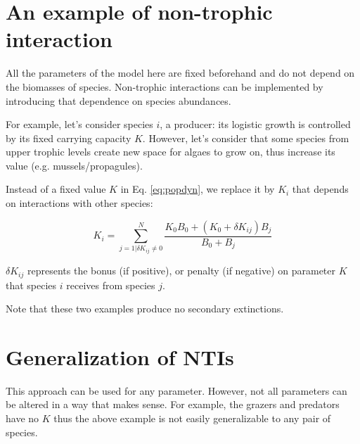 \documentclass[a4paper,11pt]{article}
\begin{document}
  
  \section{An example of non-trophic interaction}
    All the parameters of the model here are fixed beforehand and do not depend 
on the biomasses of species. Non-trophic interactions can be implemented by 
introducing that dependence on species abundances.
    
    For example, let's consider species $i$, a producer: its logistic growth is 
controlled by its fixed carrying capacity $K$. However, let's consider that some 
species from upper trophic levels create new space for algaes to grow on, thus 
increase its value (e.g. mussels/propagules). 
    
    Instead of a fixed value $K$ in Eq. \ref{eq:popdyn}, we replace it by 
$K_{i}$ that depends on interactions with other species: 
    
    \begin{equation}
      K_{i} = \sum_{j=1|\delta K_{ij}\neq0}^{N} \frac{ K_0 B_0 + (K_0 + \delta K_{ij}) B_j }{ B_0 + B_j }
    \end{equation}
    
    $\delta K_{ij}$ represents the bonus (if positive), or penalty (if negative) 
on parameter $K$ that species $i$ receives from species $j$. 
    
  
  Note that these two examples produce no secondary extinctions.
  
  \section{Generalization of NTIs}
    This approach can be used for any parameter. However, not all parameters can 
be altered in a way that makes sense. For example, the grazers and predators 
have no $K$ thus the above example is not easily generalizable to any pair of
species.
    
\end{document}
